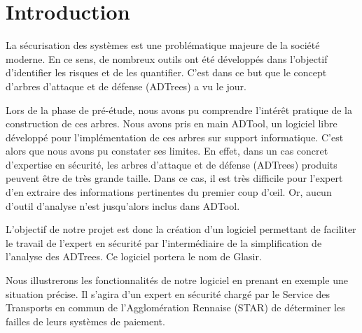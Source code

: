 \section{Introduction}
	
	La sécurisation des systèmes est une problématique majeure de la société moderne. En ce sens, de nombreux outils %
	ont été développés dans l'objectif d'identifier les risques et de les quantifier. C'est dans ce but que le concept d'arbres d'attaque et de défense (ADTrees) a vu le jour.
	
	Lors de la phase de pré-étude, nous avons pu comprendre l’intérêt pratique de la construction de ces arbres. %
	Nous avons pris en main ADTool, un logiciel libre développé pour l'implémentation de ces arbres sur support informatique. C'est alors que nous avons pu constater ses limites. En effet, dans un cas concret d'expertise en sécurité, %
	les arbres d'attaque et de défense (ADTrees) produits peuvent être de très grande taille. Dans ce cas, il est très difficile pour l'expert d'en extraire des informations pertinentes du premier coup d’œil. Or, aucun d'outil d'analyse n'est jusqu'alors inclus dans ADTool.

	L'objectif de notre projet est donc la création d'un logiciel permettant de faciliter le travail de l'expert en sécurité par l’intermédiaire de la simplification de l'analyse des ADTrees. %
	 Ce logiciel portera le nom de Glasir. %

	Nous illustrerons les fonctionnalités de notre logiciel en prenant en exemple une situation précise. Il s'agira d'un expert en sécurité chargé par le Service des Transports en commun de l'Agglomération Rennaise (STAR) de déterminer les failles de leurs systèmes de paiement. 













